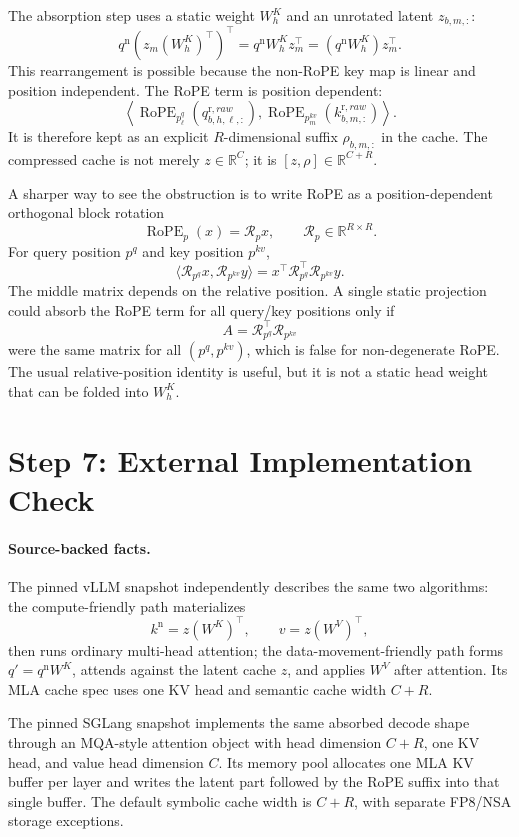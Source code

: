 \documentclass[11pt]{article}
\newcommand{\R}{\mathbb{R}}
\newcommand{\RoPE}{\operatorname{RoPE}}
\begin{document}
The absorption step uses a static weight $W^K_h$ and an unrotated latent
$z_{b,m,:}$:
\[
  q^{\mathrm n}\!\left(z_m(W^K_h)^\top\right)^\top
  =
  q^{\mathrm n}W^K_h z_m^\top
  =
  (q^{\mathrm n} W^K_h) z_m^\top.
\]
This rearrangement is possible because the non-RoPE key map is linear and
position independent.  The RoPE term is position dependent:
\[
  \left\langle
    \RoPE_{p^q_\ell}(q^{\mathrm r,raw}_{b,h,\ell,:}),
    \RoPE_{p^{kv}_m}(k^{\mathrm r,raw}_{b,m,:})
  \right\rangle .
\]
It is therefore kept as an explicit $R$-dimensional suffix $\rho_{b,m,:}$ in
the cache.  The compressed cache is not merely $z\in\R^C$; it is
$[z,\rho]\in\R^{C+R}$.

A sharper way to see the obstruction is to write RoPE as a position-dependent
orthogonal block rotation
\[
  \RoPE_p(x)=\mathcal R_p x,
  \qquad
  \mathcal R_p\in\R^{R\times R}.
\]
For query position $p^q$ and key position $p^{kv}$,
\[
  \langle \mathcal R_{p^q}x,\mathcal R_{p^{kv}}y\rangle
  =
  x^\top \mathcal R_{p^q}^{\top}\mathcal R_{p^{kv}}y.
\]
The middle matrix depends on the relative position.  A single static projection
could absorb the RoPE term for all query/key positions only if
\[
  A=\mathcal R_{p^q}^{\top}\mathcal R_{p^{kv}}
\]
were the same matrix for all $(p^q,p^{kv})$, which is false for non-degenerate
RoPE.  The usual relative-position identity is useful, but it is not a static
head weight that can be folded into $W^K_h$.

\section{Step 7: External Implementation Check}

\paragraph{Source-backed facts.}
The pinned vLLM snapshot independently describes the same two algorithms:
the compute-friendly path materializes
\[
  k^{\mathrm n}=z(W^K)^\top,\qquad v=z(W^V)^\top,
\]
then runs ordinary multi-head attention; the data-movement-friendly path forms
$q'=q^{\mathrm n}W^K$, attends against the latent cache $z$, and applies
$W^V$ after attention.  Its MLA cache spec uses one KV head and semantic cache
width $C+R$.

The pinned SGLang snapshot implements the same absorbed decode shape through an
MQA-style attention object with head dimension $C+R$, one KV head, and value
head dimension $C$.  Its memory pool allocates one MLA KV buffer per layer and
writes the latent part followed by the RoPE suffix into that single buffer.  The
default symbolic cache width is $C+R$, with separate FP8/NSA storage
exceptions.
\end{document}
